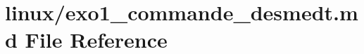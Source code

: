\hypertarget{exo1__commande__desmedt_8md}{}\section{linux/exo1\+\_\+commande\+\_\+desmedt.md File Reference}
\label{exo1__commande__desmedt_8md}

